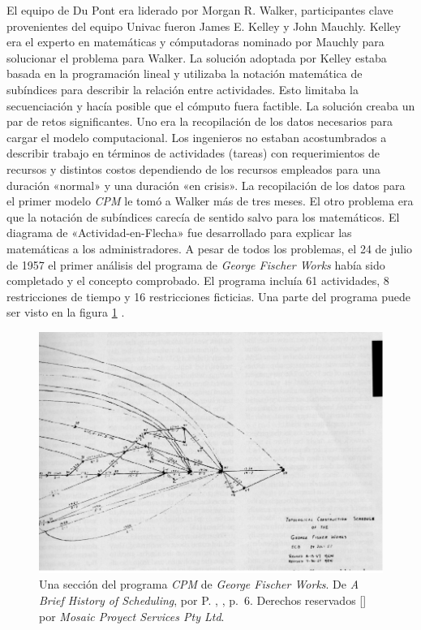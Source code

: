 \documentclass[spanish,draft,12pt,headsepline,footsepline,paper=letter]{scrreprt}
\begin{document}
El equipo de Du Pont era liderado por Morgan R. Walker, participantes clave provenientes del equipo Univac fueron James E. Kelley y John Mauchly. Kelley era el experto en matemáticas y cómputadoras nominado por Mauchly para solucionar el problema para Walker. La solución adoptada por Kelley estaba basada en la programación lineal y utilizaba la notación matemática de subíndices para describir la relación entre actividades. Esto limitaba la secuenciación y hacía posible que el cómputo fuera factible.
%
La solución creaba un par de retos significantes. Uno era la recopilación de los datos necesarios para cargar el modelo computacional. Los ingenieros no estaban acostumbrados a describir trabajo en términos de actividades (tareas) con requerimientos de recursos y distintos costos dependiendo de los recursos empleados para una duración «normal» y una duración «en crisis». La recopilación de los datos para el primer modelo \textit{CPM} le tomó a Walker más de tres meses. El otro problema era que la notación de subíndices carecía de sentido salvo para los matemáticos. El diagrama de «Actividad-en-Flecha» fue desarrollado para explicar las matemáticas a los administradores. A pesar de todos los problemas, el 24 de julio de 1957 el primer análisis del programa de \textit{George Fischer Works} había sido completado y el concepto comprobado. El programa incluía 61 actividades, 8 restricciones de tiempo y 16 restricciones ficticias. Una parte del programa puede ser visto en la figura \ref{fig:cpm_george_fischer_works} \citep[p.~5,~6]{Weaver2006}.

\begin{figure}
\includegraphics[width=\textwidth]{media/cpm_gfw.pdf}
\caption[Gráfica de CPM]{Una sección del programa \textit{CPM} de \textit{George Fischer Works}. De \textit{A Brief History of Scheduling}, por P. \citeauthor{Weaver2006}, \citeyear{Weaver2006}, p.~6. Derechos reservados [\citeyear{Weaver2006}] por \textit{Mosaic Proyect Services Pty Ltd}.}
\label{fig:cpm_george_fischer_works}
\end{figure}
\end{document}
